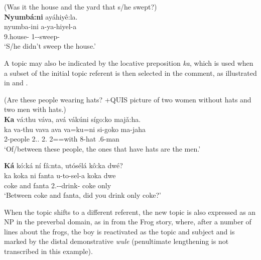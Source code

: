 \documentclass[output=paper]{langscibook}
\begin{document}
\z

\ea
\label{bkm:Ref141347637}
(Was it the house and the yard that s/he swept?)\\
\textbf{Nyumbá:ni} ayáhiyê:la.\\
\gll
nyumba-ini  a-ya-hiyel-a\\
9.house-\LOC{}  1\SM{}-\NEG{}-sweep-\FV{}\\
\glt
‘S/he didn’t sweep the house.’\\

\z

A topic may also be indicated by the locative preposition \textit{ka}, which is used when a subset of the initial topic referent is then selected in the comment, as illustrated in  and .

\ea
\label{bkm:Ref120093070}
(Are these people wearing hats? +QUIS picture of two women without hats and two men with hats.)\\
\textbf{Ka} vá:thu váva, avá vákúni sígo:ko majǎ:ha.\\
\gll
ka  va-thu  vava  ava  va=ku=ni  si-goko  ma-jaha\\
\LOC{}  2-people  2.\DEM{}.\MED{}  2.\PRO{}  2\SM=\REL{}=with  8-hat  \COP{}.6-man\\
\glt
‘Of/between these people, the ones that have hats are the men.’\\

\z

\ea
\label{bkm:Ref120093071}
\textbf{Ká} kó:ká ní fâ:nta, utósélá kô:ka dwé?\\
\gll
ka  koka  ni  fanta  u-to-sel-a  koka  dwe\\
\LOC{}  coke  and  fanta  2\SG.\SM{}-\TO{}-drink-\FV{}  coke  only\\
\glt
‘Between coke and fanta, did you drink only coke?’\\

\z

When the topic shifts to a different referent, the new topic is also expressed as an NP in the preverbal domain, as in  from the Frog story, where, after a number of lines about the frogs, the boy is reactivated as the topic and subject and is marked by the distal demonstrative \textit{wule} (penultimate lengthening is not transcribed in this example).
\end{document}
